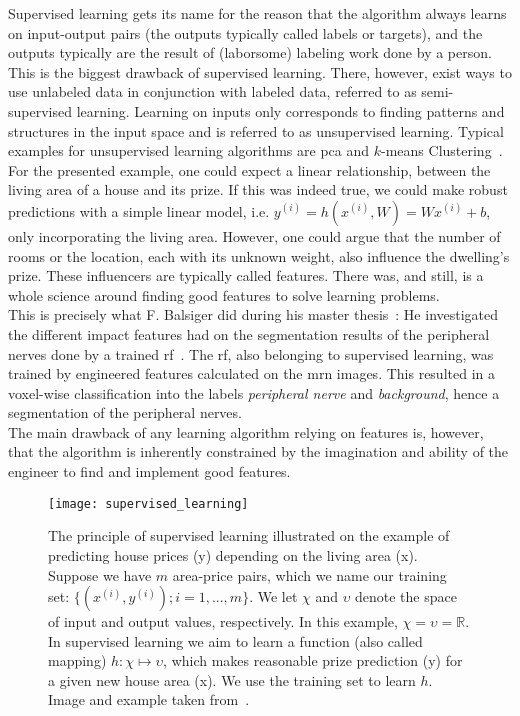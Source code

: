 Supervised learning gets its name for the reason that the algorithm always learns on input-output pairs (the outputs typically called labels or targets), and the outputs typically are the result of (laborsome) labeling work done by a person. This is the biggest drawback of supervised learning. There, however, exist ways to use unlabeled data in conjunction with labeled data, referred to as semi-supervised learning. Learning on inputs only corresponds to finding patterns and structures in the input space and is referred to as unsupervised learning. Typical examples for unsupervised learning algorithms are \gls{pca} and $k$-means Clustering~\cite{Goodfellow2016DeepLearning}.\\
For the presented example, one could expect a linear relationship, between the living area of a house and its prize. If this was indeed true, we could make robust predictions with a simple linear model, i.e. $y^{(i)} = h(x^{(i)}, W) = Wx^{(i)} + b$, only incorporating the living area. However, one could argue that the number of rooms or the location, each with its unknown weight, also influence the dwelling's prize. These influencers are typically called features. There was, and still, is a whole science around finding good features to solve learning problems.\\
This is precisely what F. Balsiger did during his master thesis~\cite{Balsiger2016DevelopmentApproaches}: He investigated the different impact features had on the segmentation results of the peripheral nerves done by a trained \gls{rf}~\cite{Breiman2001RandomForests}. The \gls{rf}, also belonging to supervised learning, was trained by engineered features calculated on the \gls{mrn} images. This resulted in a voxel-wise classification into the labels \textit{peripheral nerve} and \textit{background}, hence a segmentation of the peripheral nerves. \\
The main drawback of any learning algorithm relying on features is, however, that the algorithm is inherently constrained by the imagination and ability of the engineer to find and implement good features.

\begin{figure}[htbp]
    \centering
	\texttt{[image: supervised\_learning]}
    \caption[Supervised Learning]{The principle of supervised learning illustrated on the example of predicting house prices (y) depending on the living area (x). Suppose we have $m$ area-price pairs, which we name our training set: $\{(x^{(i)}, y^{(i)}); i = 1,...,m\}$. We let $\chi$ and $\upsilon$ denote the space of input and output values, respectively. In this example, $\chi = \upsilon = \mathbb{R}$. In supervised learning we aim to learn a function (also called mapping) $h : \chi \mapsto \upsilon$, which makes reasonable prize prediction (y) for a given new house area (x). We use the training set to learn $h$. Image and example taken from~\cite{Ng2012StanfordNotes}.}
    \label{fig:dl_supervised}
\end{figure}

